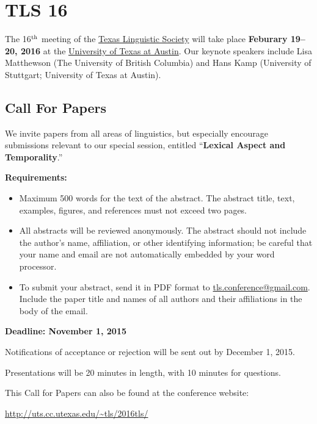 \documentclass[11pt]{article}
\begin{document}
\clearpage\thispagestyle{empty}

\section*{TLS 16}

The 16$^{\rm th}$ meeting of the \href{http://uts.cc.utexas.edu/~tls}{Texas Linguistic Society} will take place \textbf{Feburary 19--20, 2016} at the \href{https://www.utexas.edu/cola/depts/linguistics/}{University of Texas at Austin}. Our keynote speakers include Lisa Matthewson (The University of British Columbia) and Hans Kamp (University of Stuttgart; University of Texas at Austin).

\subsection*{Call For Papers}

We invite papers from all areas of linguistics, but especially encourage submissions relevant to our special session, entitled ``\textbf{Lexical Aspect and Temporality}.''

\bigskip\noindent
\textbf{Requirements:}

\begin{itemize}
  \setlength{\itemsep}{2pt}
  \setlength{\parskip}{2pt}
  \item Maximum 500 words for the text of the abstract. The abstract title, text, examples, figures, and references must not exceed two pages.
  \item All abstracts will be reviewed anonymously. The abstract should not include the author’s name, affiliation, or other identifying information; be careful that your name and email are not automatically embedded by your word processor.
  \item To submit your abstract, send it in PDF format to \href{mailto:tls.conference@gmail.com}{tls.conference@gmail.com}. Include the paper title and names of all authors and their affiliations in the body of the email.
\end{itemize}

\textbf{Deadline: November 1, 2015}

\bigskip\noindent
Notifications of acceptance or rejection will be sent out by December 1, 2015.

\medskip\noindent
Presentations will be 20 minutes in length, with 10 minutes for questions.

\medskip\noindent
This Call for Papers can also be found at the conference website:

\medskip
\url{http://uts.cc.utexas.edu/~tls/2016tls/}
\end{document}
